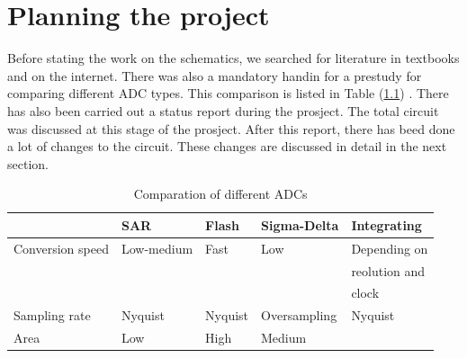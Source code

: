 \documentclass[english, 12pt, a4paper]{ifimaster}
\begin{document}
\chapter{Planning the project} 
Before stating the work on the schematics, we searched for literature in textbooks and on the internet. There was also a mandatory handin for a prestudy for comparing different ADC types. This 
comparison is listed in Table (\ref{comp:adc}) \cite{forstudie}. There has also been carried out a status report during the prosject. The total circuit was discussed at this stage of the prosject.
After this report, there has beed done a lot of changes to the circuit. These changes are discussed in detail in the next section. 

\begin{table}[!ht]
 \centering
 \begin{tabular}{|l|l|l|l|l|}
  \hline
                   & SAR        & Flash   & Sigma-Delta  & Integrating          \\ \hline
  Conversion speed & Low-medium & Fast    & Low          & Depending on 	\\
		   &	        &	  &		 & reolution and 	\\
		   &		&	  &		 & clock 		\\ \hline
  Sampling rate    & Nyquist    & Nyquist & Oversampling & Nyquist              \\ \hline
  Area             & Low        & High    & Medium       &                      \\ \hline
 \end{tabular}
 \caption{Comparation of different ADCs}
 \label{comp:adc}
\end{table}



\end{document}
